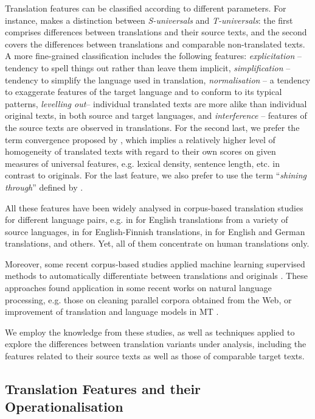 \documentclass[output=paper]{LSP/langsci}
\begin{document}
Translation features can be classified according to different parameters. For instance, \citet{Chesterman2004} makes a distinction between \textit{S-universals} and \textit{T-universals}: the ﬁrst comprises differences between translations and their source texts, and the second covers the differences between translations and comparable non-translated texts. A more ﬁne-grained classification includes the following features: \textit{explicitation} – tendency to spell things out rather than leave them implicit, \textit{simplification} – tendency to simplify the language used in translation, \textit{normalisation} – a tendency to exaggerate features of the target language and to conform to its typical patterns, \textit{levelling out}– individual translated texts are more alike than individual original texts, in both source and target languages, and \textit{interference} – features of the source texts are observed in translations. For the second last, we prefer the term convergence proposed by \citet{Laviosa2002}, which implies a relatively higher level of homogeneity of translated texts with regard to their own scores on given measures of universal features, e.g. lexical density, sentence length, etc. in contrast to originals.  For the last feature, we also prefer to use the term “\textit{shining through}” defined by \citet{Teich2003}.

All these features have been widely analysed in corpus-based translation studies for different language pairs, e.g. in \citet{Laviosa1996} for English translations from a variety of source languages, in \citet{Mauranen2000} for English-Finnish translations, in \citet{Teich2003} for English and German translations, and others. Yet, all of them concentrate on human translations only.

Moreover, some recent corpus-based studies applied machine learning supervised methods to automatically differentiate between translations and originals \citep[e.g.][]{Baroni2006}. These approaches found application in some recent works on natural language processing, e.g. those on cleaning parallel corpora obtained from the Web, or improvement of translation and language models in MT  \citep[e.g.][]{Kurokawa2009,KoppelOrdan2011,Lembersky2012}.

We employ the knowledge from these studies, as well as techniques applied to explore the differences between translation variants under analysis, including the features related to their source texts as well as those of comparable target texts.

\subsection{Translation Features and their Operationalisation} \label{sec:4:2:2}
\end{document}
